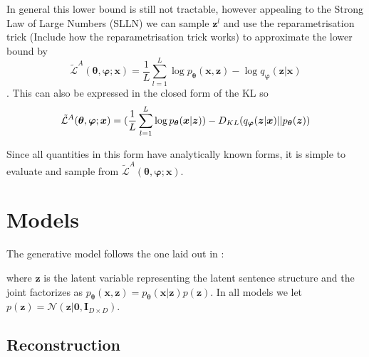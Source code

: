 In general this lower bound is still not tractable, however appealing to the
Strong Law of Large Numbers (SLLN) we can sample $\bm{z}^{l}$ and use the
reparametrisation trick (Include how the reparametrisation trick works) to approximate the lower bound by
\begin{equation}
  \label{eq:SGVB}
  \tilde{\mathcal{L}}^A(\bm{\theta}, \bm{\varphi}; \bm{x}) = \frac{1}{L} \sum_{l = 1}^L \log p_{\bm{\theta}}(\bm{x}, \bm{z}) - \log q_{\bm{\varphi}}(\bm{z} | \bm{x})
\end{equation}.
This can also be expressed in the closed form of the KL so
\begin{equation}
  \label{eq:SGVB_analytical_KL}
  \tilde{\mathcal{L}}^A(\bm{\theta}, \bm{\varphi}; \bm{x}) = (\frac{1}{L} \sum_{l = 1}^L \log p_{\bm{\theta}}(\bm{x} | \bm{z})) - D_{KL}(q_{\bm{\varphi}}(\bm{z} | \bm{x}) || p_{\bm{\theta}}(\bm{z}))
\end{equation}

Since all quantities in this form have analytically known forms, it is simple to
evaluate and sample from $\tilde{\mathcal{L}}^A(\bm{\theta}, \bm{\varphi}; \bm{x})$.

\section{Models}

The generative model follows the one laid out in
\cite{kingma_auto-encoding_2013}:

\begin{figure}[H]
  \center
\end{figure}

where $\bm{z}$ is the latent variable representing the latent sentence structure
and the joint factorizes as $p_{\bm{\theta}}(\bm{x}, \bm{z}) =
p_{\bm{\theta}}(\bm{x} | \bm{z})p(\bm{z})$. In all models we let $p(\bm{z}) =
\mathcal{N}(\bm{z}| \bm{0}, \bm{I}_{D \times D})$.

\subsection{Reconstruction}

